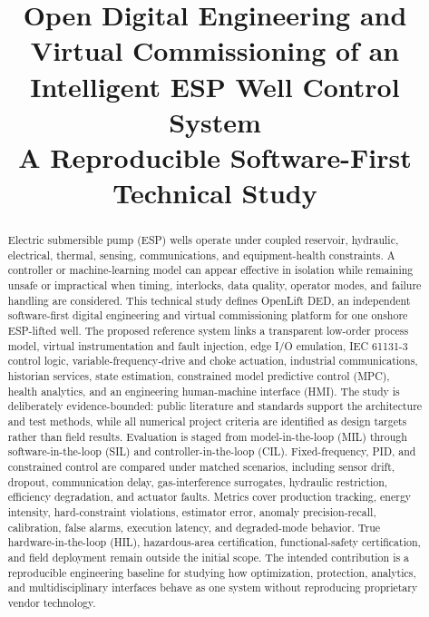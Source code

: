 \documentclass[conference]{IEEEtran}
\date{}
\begin{document}
\title{Open Digital Engineering and Virtual Commissioning of an Intelligent ESP Well Control System\\
\large A Reproducible Software-First Technical Study}

\author{
}

\maketitle

\begin{abstract}
Electric submersible pump (ESP) wells operate under coupled reservoir, hydraulic, electrical, thermal, sensing, communications, and equipment-health constraints. A controller or machine-learning model can appear effective in isolation while remaining unsafe or impractical when timing, interlocks, data quality, operator modes, and failure handling are considered. This technical study defines OpenLift DED, an independent software-first digital engineering and virtual commissioning platform for one onshore ESP-lifted well. The proposed reference system links a transparent low-order process model, virtual instrumentation and fault injection, edge I/O emulation, IEC 61131-3 control logic, variable-frequency-drive and choke actuation, industrial communications, historian services, state estimation, constrained model predictive control (MPC), health analytics, and an engineering human-machine interface (HMI). The study is deliberately evidence-bounded: public literature and standards support the architecture and test methods, while all numerical project criteria are identified as design targets rather than field results. Evaluation is staged from model-in-the-loop (MIL) through software-in-the-loop (SIL) and controller-in-the-loop (CIL). Fixed-frequency, PID, and constrained control are compared under matched scenarios, including sensor drift, dropout, communication delay, gas-interference surrogates, hydraulic restriction, efficiency degradation, and actuator faults. Metrics cover production tracking, energy intensity, hard-constraint violations, estimator error, anomaly precision-recall, calibration, false alarms, execution latency, and degraded-mode behavior. True hardware-in-the-loop (HIL), hazardous-area certification, functional-safety certification, and field deployment remain outside the initial scope. The intended contribution is a reproducible engineering baseline for studying how optimization, protection, analytics, and multidisciplinary interfaces behave as one system without reproducing proprietary vendor technology.
\end{abstract}
\end{document}

